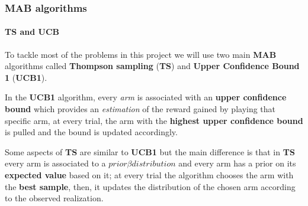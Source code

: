 
\begin{frame}

\frametitle{MAB algorithms}
\framesubtitle{TS and UCB}

\vspace*{-0.5em}
To tackle most of the problems in this project we will use two main \textbf{MAB} algorithms called \textbf{Thompson sampling} (\textbf{TS}) and \textbf{Upper Confidence Bound 1} (\textbf{UCB1}).

In the \textbf{UCB1} algorithm, every \textit{arm} is associated with an \textbf{upper confidence bound} which provides an \textit{estimation} of the reward gained by playing that specific arm, at every trial, the arm with the \textbf{highest upper confidence bound} is pulled and the bound is updated accordingly.

Some aspects of \textbf{TS} are similar to \textbf{UCB1} but the main difference is that in \textbf{TS} every arm is associated to a $prior \beta distribution$ and every arm has a prior on its \textbf{expected value} based on it; at every trial the algorithm chooses the arm with the \textbf{best sample}, then, it updates the distribution of the chosen arm according to the observed realization.

\end{frame}

